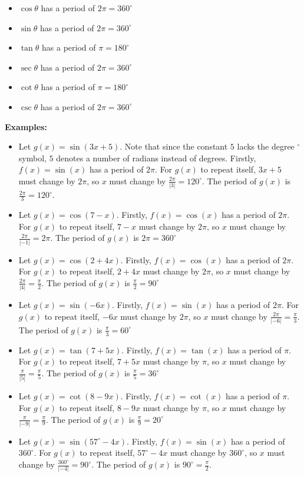 \documentclass{article}
\begin{document}
\begin{itemize}
\item \(\cos\theta\) has a period of \(2\pi = 360^\circ\)
\item \(\sin\theta\) has a period of \(2\pi = 360^\circ\)
\item \(\tan\theta\) has a period of \(\pi = 180^\circ\)
\item \(\sec\theta\) has a period of \(2\pi = 360^\circ\)
\item \(\cot\theta\) has a period of \(\pi = 180^\circ\)
\item \(\csc\theta\) has a period of \(2\pi = 360^\circ\)
\end{itemize}


\textbf{Examples:}
\begin{itemize}
\item  Let \(g(x) = \sin(3x + 5)\). Note that since the constant \(5\) lacks the degree \(^\circ\) symbol, \(5\) denotes a number of radians instead of degrees. Firstly, \(f(x) = \sin(x)\) has a period of \(2\pi\). For \(g(x)\) to repeat itself, \(3x + 5\) must change by \(2\pi\), so \(x\) must change by \(\frac{2\pi}{|3|} = 120^\circ\). The period of \(g(x)\) is \(\frac{2\pi}{3} = 120^\circ\).
\item  Let \(g(x) = \cos(7 - x)\). Firstly, \(f(x) = \cos(x)\) has a period of \(2\pi\). For \(g(x)\) to repeat itself, \(7 - x\) must change by \(2\pi\), so \(x\) must change by \(\frac{2\pi}{|-1|} = 2\pi\). The period of \(g(x)\) is \(2\pi = 360^\circ\)
\item  Let \(g(x) = \cos(2 + 4x)\). Firstly, \(f(x) = \cos(x)\) has a period of \(2\pi\). For \(g(x)\) to repeat itself, \(2 + 4x\) must change by \(2\pi\), so \(x\) must change by \(\frac{2\pi}{|4|} = \frac{\pi}{2}\). The period of \(g(x)\) is \(\frac{\pi}{2} = 90^\circ\)
\item  Let \(g(x) = \sin(-6x)\). Firstly, \(f(x) = \sin(x)\) has a period of \(2\pi\). For \(g(x)\) to repeat itself, \(-6x\) must change by \(2\pi\), so \(x\) must change by \(\frac{2\pi}{|-6|} = \frac{\pi}{3}\). The period of \(g(x)\) is \(\frac{\pi}{3} = 60^\circ\)
\item  Let \(g(x) = \tan(7 + 5x)\). Firstly, \(f(x) = \tan(x)\) has a period of \(\pi\). For \(g(x)\) to repeat itself, \(7 + 5x\) must change by \(\pi\), so \(x\) must change by \(\frac{\pi}{|5|} = \frac{\pi}{5}\). The period of \(g(x)\) is \(\frac{\pi}{5} = 36^\circ\)
\item  Let \(g(x) = \cot(8 - 9x)\). Firstly, \(f(x) = \cot(x)\) has a period of \(\pi\). For \(g(x)\) to repeat itself, \(8 - 9x\) must change by \(\pi\), so \(x\) must change by \(\frac{\pi}{|-9|} = \frac{\pi}{9}\). The period of \(g(x)\) is \(\frac{\pi}{9} = 20^\circ\)
\item Let \(g(x) = \sin(57^\circ - 4x)\). Firstly, \(f(x) = \sin(x)\) has a period of \(360^\circ\). For \(g(x)\) to repeat itself, \(57^\circ - 4x\) must change by \(360^\circ\), so \(x\) must change by \(\frac{360^\circ}{|-4|} = 90^\circ\). The period of \(g(x)\) is \(90^\circ = \frac{\pi}{2}\).
\end{itemize}
\end{document}
